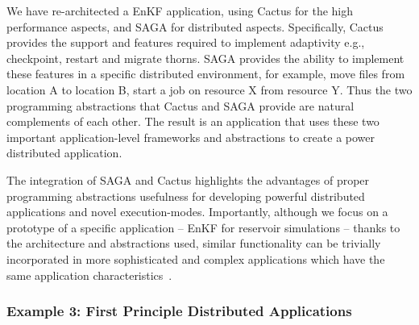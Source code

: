 \documentclass[10pt,letterpaper]{article}
\begin{document}
We have re-architected a EnKF application, using Cactus for the high
performance aspects, and SAGA for distributed aspects.  Specifically,
Cactus provides the support and features required to implement
adaptivity e.g., checkpoint, restart and migrate thorns. SAGA provides
the ability to implement these features in a specific distributed
environment, for example, move files from location A to location B,
start a job on resource X from resource Y.  Thus the two programming
abstractions that Cactus and SAGA provide are natural complements of
each other.  The result is an application that uses these two
important application-level frameworks and abstractions to create a
power distributed application.


The integration of SAGA and Cactus highlights the advantages of proper
programming abstractions usefulness for developing powerful
distributed applications and novel execution-modes.  Importantly,
although we focus on a prototype of a specific application -- EnKF for
reservoir simulations -- thanks to the architecture and abstractions
used, similar functionality can be trivially incorporated in more
sophisticated and complex applications which have the same application
characteristics~\cite{dpa-paper}.



\subsubsection*{Example 3: First Principle Distributed Applications}


\end{document}
